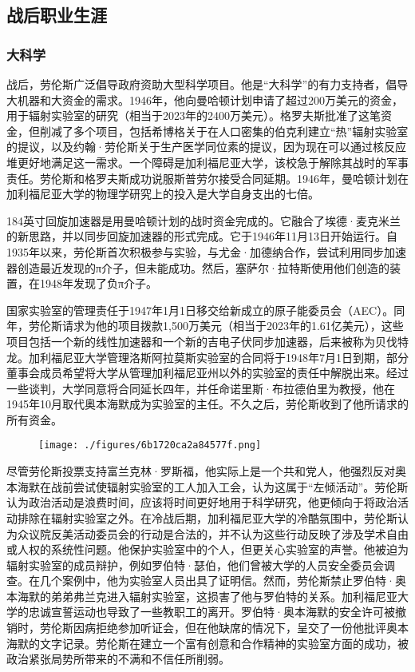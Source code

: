 \subsection{战后职业生涯}
\subsubsection{大科学}
战后，劳伦斯广泛倡导政府资助大型科学项目。他是“大科学”的有力支持者，倡导大机器和大资金的需求。1946年，他向曼哈顿计划申请了超过200万美元的资金，用于辐射实验室的研究（相当于2023年的2400万美元）。格罗夫斯批准了这笔资金，但削减了多个项目，包括希博格关于在人口密集的伯克利建立“热”辐射实验室的提议，以及约翰·劳伦斯关于生产医学同位素的提议，因为现在可以通过核反应堆更好地满足这一需求。一个障碍是加利福尼亚大学，该校急于解除其战时的军事责任。劳伦斯和格罗夫斯成功说服斯普劳尔接受合同延期。1946年，曼哈顿计划在加利福尼亚大学的物理学研究上的投入是大学自身支出的七倍。

184英寸回旋加速器是用曼哈顿计划的战时资金完成的。它融合了埃德·麦克米兰的新思路，并以同步回旋加速器的形式完成。它于1946年11月13日开始运行。自1935年以来，劳伦斯首次积极参与实验，与尤金·加德纳合作，尝试利用同步加速器创造最近发现的π介子，但未能成功。然后，塞萨尔·拉特斯使用他们创造的装置，在1948年发现了负π介子。

国家实验室的管理责任于1947年1月1日移交给新成立的原子能委员会（AEC）。同年，劳伦斯请求为他的项目拨款1,500万美元（相当于2023年的1.61亿美元），这些项目包括一个新的线性加速器和一个新的吉电子伏同步加速器，后来被称为贝伐特龙。加利福尼亚大学管理洛斯阿拉莫斯实验室的合同将于1948年7月1日到期，部分董事会成员希望将大学从管理加利福尼亚州以外的实验室的责任中解脱出来。经过一些谈判，大学同意将合同延长四年，并任命诺里斯·布拉德伯里为教授，他在1945年10月取代奥本海默成为实验室的主任。不久之后，劳伦斯收到了他所请求的所有资金。
\begin{figure}[ht]
\centering
\texttt{[image: ./figures/6b1720ca2a84577f.png]}
\caption{} \label{fig_ONST_7}
\end{figure}
尽管劳伦斯投票支持富兰克林·罗斯福，他实际上是一个共和党人，他强烈反对奥本海默在战前尝试使辐射实验室的工人加入工会，认为这属于“左倾活动”。劳伦斯认为政治活动是浪费时间，应该将时间更好地用于科学研究，他更倾向于将政治活动排除在辐射实验室之外。在冷战后期，加利福尼亚大学的冷酷氛围中，劳伦斯认为众议院反美活动委员会的行动是合法的，并不认为这些行动反映了涉及学术自由或人权的系统性问题。他保护实验室中的个人，但更关心实验室的声誉。他被迫为辐射实验室的成员辩护，例如罗伯特·瑟伯，他们曾被大学的人员安全委员会调查。在几个案例中，他为实验室人员出具了证明信。然而，劳伦斯禁止罗伯特·奥本海默的弟弟弗兰克进入辐射实验室，这损害了他与罗伯特的关系。加利福尼亚大学的忠诚宣誓运动也导致了一些教职工的离开。罗伯特·奥本海默的安全许可被撤销时，劳伦斯因病拒绝参加听证会，但在他缺席的情况下，呈交了一份他批评奥本海默的文字记录。劳伦斯在建立一个富有创意和合作精神的实验室方面的成功，被政治紧张局势所带来的不满和不信任所削弱。
